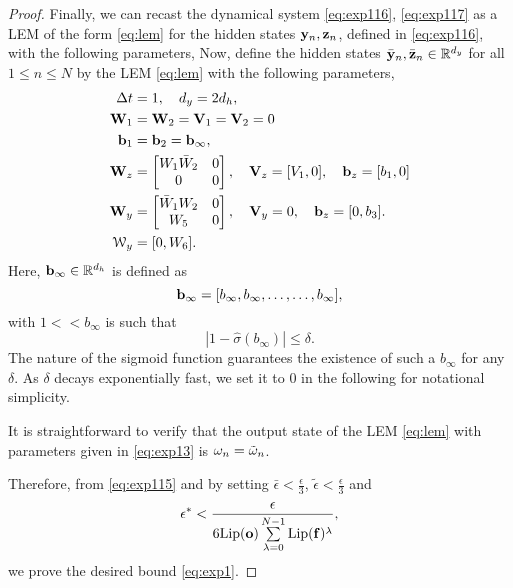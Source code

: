 \documentclass{article} \usepackage{iclr2022_conference,times}
\newcommand{\by}{{\bf y}}
\newcommand{\bz}{{\bf z}}
\newcommand{\bW}{{\bf W}}
\newcommand{\bb}{{\bf b}}
\newcommand{\bV}{{\bf V}}
\newcommand{\bo}{{\bf o}}
\newcommand{\R}{{\mathbb R}}
\newcommand{\Dt}{{\Delta t}}
\newcommand{\bif}{{\bf f}}
\newcommand{\cW}{\EuScript{W}}
\newcommand{\bom}{{\bf \omega}}
\begin{document}
\begin{proof}
Finally, we can recast the dynamical system \eqref{eq:exp116}, \eqref{eq:exp117} as a LEM of the form \eqref{eq:lem} for the hidden states $\by_n,\bz_n$, defined in \eqref{eq:exp116}, with the following parameters,
Now, define the hidden states $\bar{\by}_n,\bar{\bz}_n \in \R^{d_y}$ for all $1 \leq n \leq N$ by the LEM \eqref{eq:lem} with the following parameters, 
\begin{equation}
    \label{eq:exp13}
    \begin{aligned}
    \Dt &=1, \quad d_y = 2d_h, \\
    \bW_1 &= \bW_2=\bV_1=\bV_2 = 0\\
    \bb_1 &= \bb_2 = \bb_{\infty}, \\
    \bW_z &= \begin{bmatrix}
    W_1\bar{W}_2 & 0 \\
    0 & 0
    \end{bmatrix} , \quad \bV_z = [V_1,0], \quad \bb_z = [b_1,0] \\
     \bW_y &= \begin{bmatrix}
    \bar{W}_1 W_2 & 0 \\
    W_5 & 0
    \end{bmatrix} , \quad \bV_y = 0, \quad \bb_z = [0,b_3]. \\
    \cW_y &= [0, W_6]. 
    \end{aligned}
\end{equation}
Here, $\bb_{\infty}\in \R^{d_h}$ is defined as 
$$
\bb_{\infty} = [b_{\infty},b_{\infty},\ldots,\ldots,b_{\infty}],
$$
with $1 << b_{\infty}$ is such that 
\begin{equation}
    \label{eq:exp155}
    |1 - \hat{\sigma}(b_{\infty})| \leq \delta .
\end{equation}
The nature of the sigmoid function guarantees the existence of such a $b_{\infty}$ for any $\delta$. As $\delta$ decays exponentially fast, we set it to $0$ in the following for notational simplicity. 

It is straightforward to verify that the output state of the LEM \eqref{eq:lem} with parameters given in \eqref{eq:exp13} is $\bom_n = \tilde{\bom}_n$. 

Therefore, from \eqref{eq:exp115} and by setting $\bar{\epsilon} < \frac{\epsilon}{3}$, $\tilde{\epsilon} < \frac{\epsilon}{3}$ and
$$
\epsilon^{\ast} < \frac{\epsilon}{6{\rm Lip}(\bo)\sum\limits_{\lambda=0}^{N-1}{\rm Lip}(\bif)^\lambda},
$$
we prove the desired bound \eqref{eq:exp1}. 




\end{proof}
\end{document}
